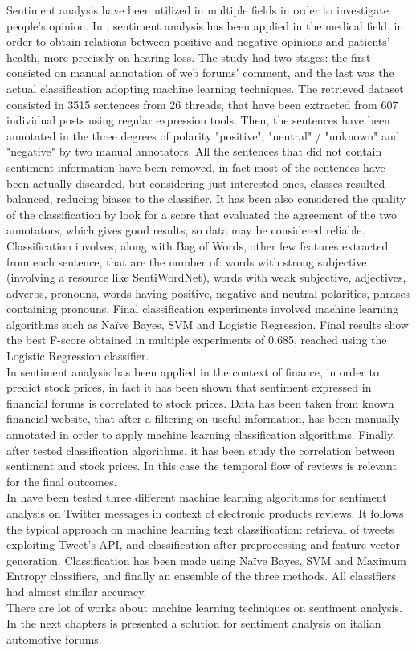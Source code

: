Sentiment analysis have been utilized in multiple fields in order to investigate people's opinion. In \cite{ali-etal-2013-hear}, sentiment analysis has been applied in the medical field, in order to obtain relations between positive and negative opinions and patients' health, more precisely on hearing loss. The study had two stages: the first consisted on manual annotation of web forums' comment, and the last was the actual classification adopting machine learning techniques. The retrieved dataset consisted in 3515 sentences from 26 threads, that have been extracted from 607 individual posts using regular expression tools. Then, the sentences have been annotated in the three degrees of polarity "positive", "neutral" / "unknown" and "negative" by two manual annotators. All the sentences that did not contain sentiment information have been removed, in fact most of the sentences have been actually discarded, but considering just interested ones, classes resulted balanced, reducing biases to the classifier. It has been also considered the quality of the classification by look for a score that evaluated the agreement of the two annotators, which gives good results, so data may be considered reliable. Classification involves, along with Bag of Words, other few features extracted from each sentence, that are the number of: words with strong subjective (involving a resource like SentiWordNet), words with weak subjective, adjectives, adverbs, pronouns, words having positive, negative and neutral polarities, phrases containing pronouns. Final classification experiments involved machine learning algorithms such as Na{\"i}ve Bayes, SVM and Logistic Regression. Final results show the best F-score obtained in multiple experiments of 0.685, reached using the Logistic Regression classifier.\\
In \cite{6705664} sentiment analysis has been applied in the context of finance, in order to predict stock prices, in fact it has been shown that sentiment expressed in financial forums is correlated to stock prices. Data has been taken from known financial website, that after a filtering on useful information, has been manually annotated in order to apply machine learning classification algorithms. Finally, after tested classification algorithms, it has been study the correlation between sentiment and stock prices. In this case the temporal flow of reviews is relevant for the final outcomes.\\
In \cite{6726818} have been tested three different machine learning algorithms for sentiment analysis on Twitter messages in context of electronic products reviews. It follows the typical approach on machine learning text classification: retrieval of tweets exploiting Tweet's API, and classification after preprocessing and feature vector generation. Classification has been made using Na{\"i}ve Bayes, SVM and Maximum Entropy classifiers, and finally an ensemble of the three methods. All classifiers had almost similar accuracy.\\
There are lot of works about machine learning techniques on sentiment analysis. In the next chapters is presented a solution for sentiment analysis on italian automotive forums.









